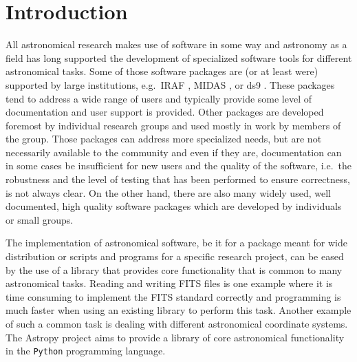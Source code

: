 \documentclass[modern]{aastex61}
\newcommand{\package}[1]{\texttt{#1}\xspace}
\newcommand{\python}{\package{Python}}
\newcommand{\astropy}{Astropy\xspace}
\begin{document}
\section{Introduction} \label{sec:intro}
All astronomical research makes use of software in some way and
astronomy as a field has long supported the development of specialized
software tools for different astronomical tasks. Some of those
software packages are (or at least were) supported by large
institutions, e.g.\ IRAF \citep[developed at NOAO,][]{IRAF}, MIDAS
\citep[developed at ESO,][]{MIDAS}, or ds9 \citep[developed at
%
%
SAO,][]{ds9}. These packages tend to address a wide range of users
and typically provide some level of documentation and user
support is provided. Other packages are developed foremost by individual research
groups and used mostly in work by members of the group. Those
packages can address more specialized needs, but are not necessarily
available to the community and even if they are, documentation can in
some cases be insufficient for new users and the quality of the
software, i.e.\ the robustness and the level of testing that has been
performed to ensure correctness, is not always clear. On the other
hand, there are also many widely used, well documented, high quality
software packages which are developed by individuals or small groups.

The implementation of astronomical software, be it for a package meant
for wide distribution or scripts and programs for a specific research
project, can be eased by the use of a library that provides core
functionality that is common to many astronomical tasks. Reading and
writing FITS files is one example where it is time
consuming to implement the FITS standard correctly and
programming is much faster when using an existing library to perform this
task. Another example of such a common task is dealing with different
astronomical coordinate systems. The \astropy project aims to provide a
library of core astronomical functionality in the \python programming
language.
\end{document}
